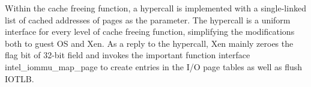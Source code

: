 Within the cache freeing function, a hypercall is implemented with a single-linked list of cached addresses of pages as the parameter. The hypercall is a uniform interface for every level of cache freeing function, simplifying the modifications both to guest OS and Xen. As a reply to the hypercall, Xen mainly zeroes the flag bit of 32-bit field and invokes the important function interface intel\_iommu\_map\_page to create entries in the I/O page tables as well as flush IOTLB.




